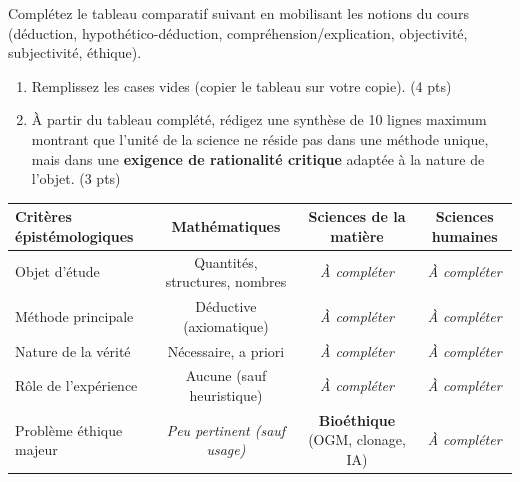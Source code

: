 \documentclass[11pt]{article}
\begin{document}
\begin{exercice}
Complétez le tableau comparatif suivant en mobilisant les notions du cours (déduction, hypothético-déduction, compréhension/explication, objectivité, subjectivité, éthique).
\begin{enumerate}
    \item Remplissez les cases vides (copier le tableau sur votre copie). (4 pts)
    \item À partir du tableau complété, rédigez une synthèse de 10 lignes maximum montrant que l'unité de la science ne réside pas dans une méthode unique, mais dans une \textbf{exigence de rationalité critique} adaptée à la nature de l'objet. (3 pts)
\end{enumerate}

\begin{tabularx}{\linewidth}{|X|c|c|c|}
\hline
\textbf{Critères épistémologiques} & \textbf{Mathématiques} & \textbf{Sciences de la matière} & \textbf{Sciences humaines} \\ \hline
Objet d'étude & Quantités, structures, nombres & \textit{À compléter} & \textit{À compléter} \\ \hline
Méthode principale & Déductive (axiomatique) & \textit{À compléter} & \textit{À compléter} \\ \hline
Nature de la vérité & Nécessaire, a priori & \textit{À compléter} & \textit{À compléter} \\ \hline
Rôle de l'expérience & Aucune (sauf heuristique) & \textit{À compléter} & \textit{À compléter} \\ \hline
Problème éthique majeur & \textit{Peu pertinent (sauf usage)} & \textbf{Bioéthique} (OGM, clonage, IA) & \textit{À compléter} \\ \hline
\end{tabularx}
\end{exercice}
\end{document}
